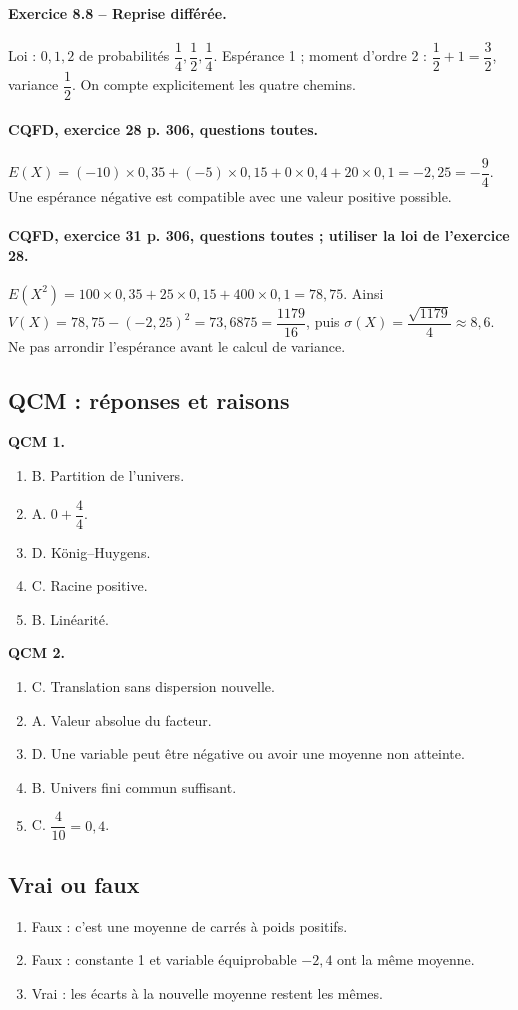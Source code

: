 \paragraph{Exercice 8.8 -- Reprise différée.} Loi : $0,1,2$ de probabilités $\dfrac{1}{4},\dfrac{1}{2},\dfrac{1}{4}$. Espérance 1 ; moment d’ordre 2 : $\dfrac{1}{2}+1=\dfrac{3}{2}$, variance $\dfrac{1}{2}$. On compte explicitement les quatre chemins.
\paragraph{CQFD, exercice 28 p. 306, questions toutes.} $E(X)=(-10)\times0{,}35+(-5)\times0{,}15+0\times0{,}4+20\times0{,}1=-2{,}25=-\dfrac94$. Une espérance négative est compatible avec une valeur positive possible.
\paragraph{CQFD, exercice 31 p. 306, questions toutes ; utiliser la loi de l’exercice 28.} $E(X^2)=100\times0{,}35+25\times0{,}15+400\times0{,}1=78{,}75$. Ainsi $V(X)=78{,}75-(-2{,}25)^2=73{,}6875=\dfrac{1179}{16}$, puis $\sigma(X)=\dfrac{\sqrt{1179}}4\approx8{,}6$. Ne pas arrondir l’espérance avant le calcul de variance.
\subsection*{QCM : réponses et raisons}
\textbf{QCM 1.}
\begin{enumerate}
\item B. Partition de l’univers.
\item A. $0+\dfrac{4}{4}$.
\item D. König–Huygens.
\item C. Racine positive.
\item B. Linéarité.
\end{enumerate}
\textbf{QCM 2.}
\begin{enumerate}
\item C. Translation sans dispersion nouvelle.
\item A. Valeur absolue du facteur.
\item D. Une variable peut être négative ou avoir une moyenne non atteinte.
\item B. Univers fini commun suffisant.
\item C. $\dfrac{4}{10}=0{,}4$.
\end{enumerate}
\subsection*{Vrai ou faux}
\begin{enumerate}
\item Faux : c’est une moyenne de carrés à poids positifs.
\item Faux : constante 1 et variable équiprobable $-2,4$ ont la même moyenne.
\item Vrai : les écarts à la nouvelle moyenne restent les mêmes.
\end{enumerate}
